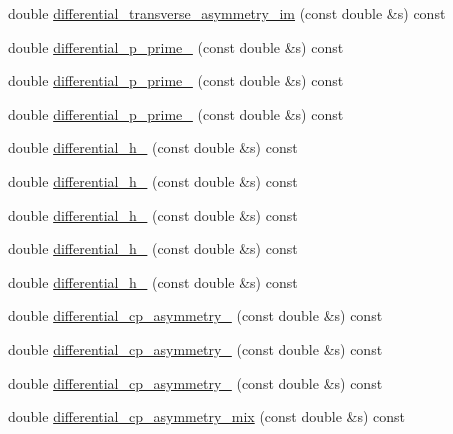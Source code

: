\begin{DoxyCompactItemize}
\item 
double \hyperlink{classeos_1_1BToKstarDilepton_3_01LowRecoil_01_4_a85022b9ced2ab3c8f875043257818731}{differential\_\-transverse\_\-asymmetry\_\-im} (const double \&s) const 
\item 
double \hyperlink{classeos_1_1BToKstarDilepton_3_01LowRecoil_01_4_aae0ddf3ba1ac8088fee62cf24c358972}{differential\_\-p\_\-prime\_} (const double \&s) const 
\item 
double \hyperlink{classeos_1_1BToKstarDilepton_3_01LowRecoil_01_4_a565c2ebdd15cf39098d2087b14340f2a}{differential\_\-p\_\-prime\_} (const double \&s) const 
\item 
double \hyperlink{classeos_1_1BToKstarDilepton_3_01LowRecoil_01_4_a4ff506dfe782b6b4c65c8f7b449c3411}{differential\_\-p\_\-prime\_} (const double \&s) const 
\item 
double \hyperlink{classeos_1_1BToKstarDilepton_3_01LowRecoil_01_4_acaebeb060dd304ffa90a4142ac58e265}{differential\_\-h\_} (const double \&s) const 
\item 
double \hyperlink{classeos_1_1BToKstarDilepton_3_01LowRecoil_01_4_a6e2af2f882e5f28f86078f9a539edfe1}{differential\_\-h\_} (const double \&s) const 
\item 
double \hyperlink{classeos_1_1BToKstarDilepton_3_01LowRecoil_01_4_af2792603343aa00c8b1d4e493e296428}{differential\_\-h\_} (const double \&s) const 
\item 
double \hyperlink{classeos_1_1BToKstarDilepton_3_01LowRecoil_01_4_a650f16afbad9564997875369352d0570}{differential\_\-h\_} (const double \&s) const 
\item 
double \hyperlink{classeos_1_1BToKstarDilepton_3_01LowRecoil_01_4_a68327d76296ee6ff86a63c7f15d09c34}{differential\_\-h\_} (const double \&s) const 
\item 
double \hyperlink{classeos_1_1BToKstarDilepton_3_01LowRecoil_01_4_a408fe55d191d7d4129e02c66a1dd9dc7}{differential\_\-cp\_\-asymmetry\_} (const double \&s) const 
\item 
double \hyperlink{classeos_1_1BToKstarDilepton_3_01LowRecoil_01_4_a3f2a777318d2ec78675880849bf84ddf}{differential\_\-cp\_\-asymmetry\_} (const double \&s) const 
\item 
double \hyperlink{classeos_1_1BToKstarDilepton_3_01LowRecoil_01_4_aa6d5e0969db26d72b0e6ff81284371e3}{differential\_\-cp\_\-asymmetry\_} (const double \&s) const 
\item 
double \hyperlink{classeos_1_1BToKstarDilepton_3_01LowRecoil_01_4_abf5f93c195831bc21cf430a92089093f}{differential\_\-cp\_\-asymmetry\_\-mix} (const double \&s) const 

\end{DoxyCompactItemize}
